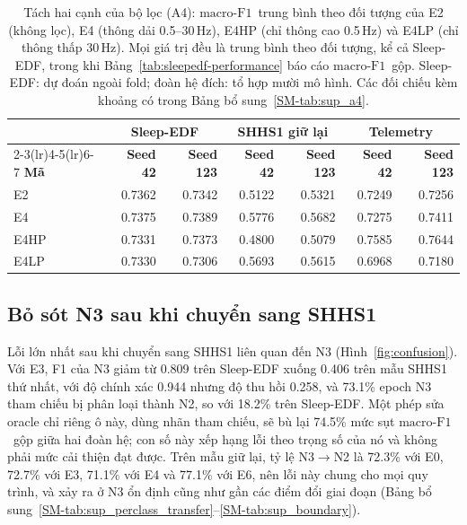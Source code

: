 \documentclass[11pt,a4paper]{article}
\newcommand{\mf}{\ensuremath{\mathrm{macro\text{-}F1}}}
\begin{document}
\begin{table}[H]
\centering
\caption{Tách hai cạnh của bộ lọc (A4): \mf\ trung bình theo đối tượng của E2 (không lọc), E4 (thông dải
0.5--30\,Hz), E4HP (chỉ thông cao 0.5\,Hz) và E4LP (chỉ thông thấp 30\,Hz). Mọi giá trị đều là trung bình theo
đối tượng, kể cả Sleep-EDF, trong khi Bảng~\ref{tab:sleepedf-performance} báo cáo \mf\ gộp. Sleep-EDF: dự đoán
ngoài fold; đoàn hệ đích: tổ hợp mười mô hình. Các đối chiếu kèm khoảng có trong Bảng
bổ sung~\ref{SM-tab:sup_a4}.}
\label{tab:edges}
\small
\begin{tabular}{lrrrrrr}
\toprule
& \multicolumn{2}{c}{\textbf{Sleep-EDF}} & \multicolumn{2}{c}{\textbf{SHHS1 giữ lại}} & \multicolumn{2}{c}{\textbf{Telemetry}} \\
\cmidrule(lr){2-3}\cmidrule(lr){4-5}\cmidrule(lr){6-7}
\textbf{Mã} & \textbf{Seed 42} & \textbf{Seed 123} & \textbf{Seed 42} & \textbf{Seed 123} & \textbf{Seed 42} & \textbf{Seed 123} \\
\midrule
E2   & 0.7362 & 0.7342 & 0.5122 & 0.5321 & 0.7249 & 0.7256 \\
E4   & 0.7375 & 0.7389 & 0.5776 & 0.5682 & 0.7275 & 0.7411 \\
E4HP & 0.7331 & 0.7373 & 0.4800 & 0.5079 & 0.7585 & 0.7644 \\
E4LP & 0.7330 & 0.7306 & 0.5693 & 0.5615 & 0.6968 & 0.7180 \\
\bottomrule
\end{tabular}
\end{table}

\subsection{Bỏ sót N3 sau khi chuyển sang SHHS1}
\label{sec:n3}

Lỗi lớn nhất sau khi chuyển sang SHHS1 liên quan đến N3 (Hình~\ref{fig:confusion}). Với E3, F1 của N3 giảm từ
0.809 trên Sleep-EDF xuống 0.406 trên mẫu SHHS1 thứ nhất, với độ chính xác 0.944 nhưng độ thu hồi 0.258, và
73.1\% epoch N3 tham chiếu bị phân loại thành N2, so với 18.2\% trên Sleep-EDF. Một phép sửa oracle chỉ riêng ô
này, dùng nhãn tham chiếu, sẽ bù lại 74.5\% mức sụt \mf\ gộp giữa hai đoàn hệ; con số này xếp hạng lỗi theo
trọng số của nó và không phải mức cải thiện đạt được. Trên mẫu giữ lại, tỷ lệ N3$\rightarrow$N2 là 72.3\% với
E0, 72.7\% với E3, 71.1\% với E4 và 77.1\% với E6, nên lỗi này chung cho mọi quy trình, và xảy ra ở N3 ổn định
cũng như gần các điểm đổi giai đoạn (Bảng
bổ sung~\ref{SM-tab:sup_perclass_transfer}--\ref{SM-tab:sup_boundary}).
\end{document}
